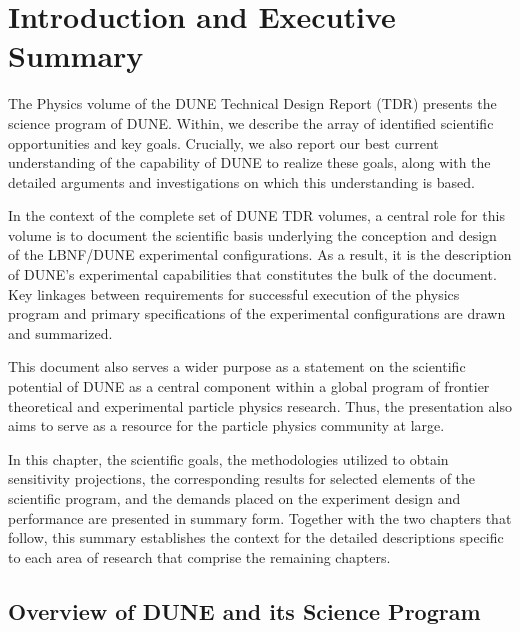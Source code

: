 \chapter{Introduction and Executive Summary}
\label{ch:exec-summ}


The Physics volume of the DUNE   Technical Design Report
(TDR) presents the science program of DUNE.
Within, we describe the array of 
identified scientific opportunities and key goals.  
Crucially, we also report our best current understanding
of the capability of DUNE to realize these goals,
along with the detailed arguments and investigations 
on which this understanding is based.

In the context of the complete set of DUNE TDR volumes,
a central role for this volume is to document the scientific
basis underlying the conception and design of the LBNF/DUNE
experimental configurations.  As a result, it is the
description of DUNE's experimental capabilities that constitutes
the bulk of the document.  Key linkages between requirements for
successful execution of the physics program and
primary specifications of the experimental configurations
are drawn and summarized.

This document also serves a wider purpose as a statement on the
scientific potential of DUNE as a central component within
a global program of frontier theoretical and experimental
particle physics research. Thus, the presentation also
aims to serve as a resource for
the particle physics community at large.

In this chapter,
the scientific goals, the methodologies utilized to obtain
sensitivity projections, the corresponding results
for selected elements of the scientific program, and
the demands placed on the experiment design and performance
are presented in summary form.  
Together with the two chapters that follow,
this summary establishes the context for the
detailed descriptions specific to each area of
research that comprise the remaining chapters.


\section{Overview of DUNE and its Science Program}
\label{sec:exec-program-overview}


